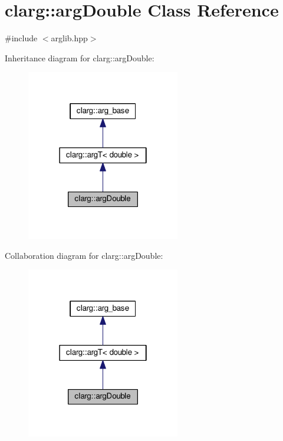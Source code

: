 \hypertarget{classclarg_1_1arg_double}{}\section{clarg\+:\+:arg\+Double Class Reference}
\label{classclarg_1_1arg_double}


{\ttfamily \#include $<$arglib.\+hpp$>$}



Inheritance diagram for clarg\+:\+:arg\+Double\+:\nopagebreak
\begin{figure}[H]
\begin{center}
\leavevmode
\includegraphics[width=190pt]{classclarg_1_1arg_double__inherit__graph}
\end{center}
\end{figure}


Collaboration diagram for clarg\+:\+:arg\+Double\+:\nopagebreak
\begin{figure}[H]
\begin{center}
\leavevmode
\includegraphics[width=190pt]{classclarg_1_1arg_double__coll__graph}
\end{center}
\end{figure}
